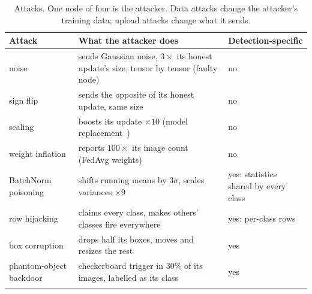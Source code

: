 \documentclass[pdflatex,sn-mathphys-num]{sn-jnl}
\begin{document}
\begin{table}[t]
\caption{Attacks. One node of four is the attacker. Data attacks change the attacker's training data; upload attacks change what it sends.}\label{tab:attacks}
\footnotesize
\begin{tabular*}{\textwidth}{@{\extracolsep\fill}>{\raggedright\arraybackslash}p{}>{\raggedright\arraybackslash}p{}>{\raggedright\arraybackslash}p{}}
\toprule
Attack & What the attacker does & Detection-specific \\
\midrule
noise & sends Gaussian noise, $3\times$ its honest update's size, tensor by tensor (faulty node) & no \\
sign flip & sends the opposite of its honest update, same size & no \\
scaling & boosts its update $\times10$ (model replacement~\cite{bagdasaryan2020backdoor}) & no \\
weight inflation & reports $100\times$ its image count (FedAvg weights) & no \\
BatchNorm poisoning & shifts running means by $3\sigma$, scales variances $\times9$ & yes: statistics shared by every class \\
row hijacking & claims every class, makes others' classes fire everywhere & yes: per-class rows \\
box corruption & drops half its boxes, moves and resizes the rest & yes \\
phantom-object backdoor & checkerboard trigger in 30\% of its images, labelled as its class~\cite{chan2022baddet} & yes \\
\botrule
\end{tabular*}
\end{table}
\end{document}
